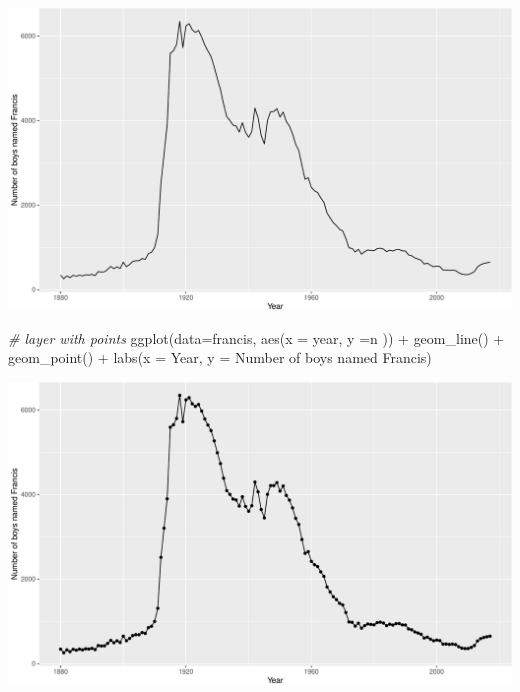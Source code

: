 \documentclass[
]{book}
\newenvironment{Shaded}{\begin{snugshade}}{\end{snugshade}}
\newcommand{\AttributeTok}[1]{\textcolor[rgb]{0.77,0.63,0.00}{#1}}
\newcommand{\CommentTok}[1]{\textcolor[rgb]{0.56,0.35,0.01}{\textit{#1}}}
\newcommand{\FunctionTok}[1]{\textcolor[rgb]{0.00,0.00,0.00}{#1}}
\newcommand{\NormalTok}[1]{#1}
\newcommand{\SpecialCharTok}[1]{\textcolor[rgb]{0.00,0.00,0.00}{#1}}
\newcommand{\StringTok}[1]{\textcolor[rgb]{0.31,0.60,0.02}{#1}}
\begin{document}
\includegraphics{figures/unnamed-chunk-148-1.pdf}

\begin{Shaded}
\begin{Highlighting}[]

\CommentTok{\# layer with points}
\FunctionTok{ggplot}\NormalTok{(}\AttributeTok{data=}\NormalTok{francis, }\FunctionTok{aes}\NormalTok{(}\AttributeTok{x =}\NormalTok{ year, }\AttributeTok{y =}\NormalTok{n )) }\SpecialCharTok{+} \FunctionTok{geom\_line}\NormalTok{() }\SpecialCharTok{+} \FunctionTok{geom\_point}\NormalTok{() }\SpecialCharTok{+} \FunctionTok{labs}\NormalTok{(}\AttributeTok{x =} \StringTok{\textquotesingle{}Year\textquotesingle{}}\NormalTok{, }\AttributeTok{y =} \StringTok{\textquotesingle{}Number of boys named Francis\textquotesingle{}}\NormalTok{)}
\end{Highlighting}
\end{Shaded}

\includegraphics{figures/unnamed-chunk-148-2.pdf}
\end{document}
